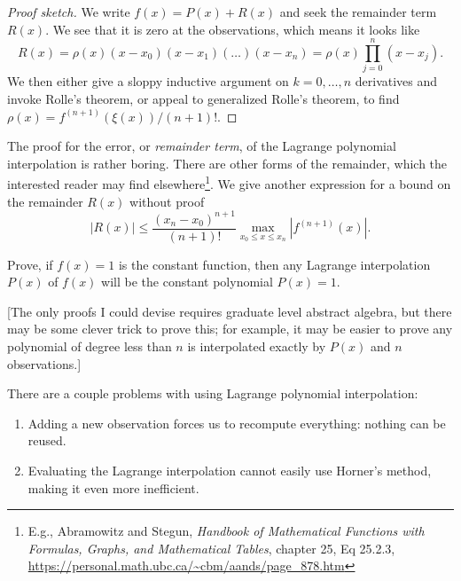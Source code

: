 \begin{proof}[Proof sketch]
We write $f(x) = P(x) + R(x)$ and seek the remainder term $R(x)$. We see
that it is zero at the observations, which means it looks like
\begin{equation}
  R(x) = \rho(x)(x-x_{0})(x-x_{1})(\dots)(x-x_{n})=\rho(x)\prod^{n}_{j=0}(x-x_{j}).
\end{equation}
We then either give a sloppy inductive argument on $k=0,\dots,n$ derivatives
and invoke Rolle's theorem, or appeal to generalized Rolle's theorem, to
find $\rho(x) = f^{(n+1)}(\xi(x))/(n+1)!$.
\end{proof}

\begin{rmk}
  The proof for the error, or \emph{remainder term}, of the Lagrange
  polynomial interpolation is rather boring. There are other forms of
  the remainder, which the interested reader may find
  elsewhere\footnote{E.g., Abramowitz and Stegun, \emph{Handbook of Mathematical Functions with Formulas, Graphs, and Mathematical Tables},
  chapter 25, Eq 25.2.3, \url{https://personal.math.ubc.ca/~cbm/aands/page_878.htm}}.
  We give another expression for a bound on the remainder $R(x)$ without proof
  \begin{equation}
    |R(x)|\leq\frac{(x_{n}-x_{0})^{n+1}}{(n+1)!}\max_{x_{0}\leq x\leq x_{n}}|f^{(n+1)}(x)|.
  \end{equation}
\end{rmk}

\begin{xca}
  Prove, if $f(x)=1$ is the constant function, then any Lagrange
  interpolation $P(x)$ of $f(x)$ will be the constant polynomial
  $P(x)=1$.
  
  [The only proofs I could devise requires graduate level abstract
    algebra, but there may be some clever trick to prove this; for
    example, it may be easier to prove any polynomial of degree less
    than $n$ is interpolated exactly by $P(x)$ and $n$ observations.]
\end{xca}

\begin{problem}
  There are a couple problems with using Lagrange polynomial
  interpolation:
  \begin{enumerate}
  \item Adding a new observation forces us to recompute everything:
    nothing can be reused.
  \item Evaluating the Lagrange interpolation cannot easily use Horner's
    method, making it even more inefficient.
  \end{enumerate}
\end{problem}


